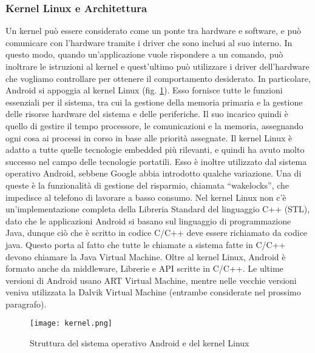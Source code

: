 \subsubsection{Kernel Linux e Architettura}
Un kernel può essere considerato come un ponte tra hardware e software, e può comunicare con
l’hardware tramite i driver che sono inclusi al suo interno. In questo modo, quando
un’applicazione vuole rispondere a un comando, può inoltrare le istruzioni al
kernel e quest’ultimo può utilizzare i driver dell’hardware che vogliamo
controllare per ottenere il comportamento desiderato. In particolare, Android si
appoggia al kernel Linux (fig. \ref{kernel}). Esso fornisce
tutte le funzioni essenziali per il sistema, tra cui la gestione della memoria
primaria e la gestione delle risorse hardware del sistema e delle periferiche.
Il suo incarico quindi è quello di gestire
il tempo processore, le comunicazioni e la memoria, assegnando ogni cosa ai processi in
corso in base alle priorità assegnate. Il kernel Linux è adatto a tutte quelle
tecnologie embedded più rilevanti, e quindi ha avuto molto successo nel campo
delle tecnologie portatili.
Esso è inoltre utilizzato dal sistema operativo Android, sebbene Google abbia
introdotto qualche variazione. Una di queste è la funzionalità di gestione
del risparmio, chiamata “wakelocks”, che impedisce al telefono di lavorare a
basso consumo. Nel kernel Linux non c’è un’implementazione completa della
Libreria Standard del linguaggio C++ (STL), dato che le applicazioni Android si
basano sul linguaggio di programmazione Java, dunque ciò che è scritto in codice
C/C++ deve essere richiamato da codice java. Questo porta al fatto che tutte le chiamate a
sistema fatte in C/C++ devono chiamare la Java Virtual Machine. Oltre al
kernel Linux, Android è formato anche da  middleware, Librerie e API scritte in C/C++. Le
ultime versioni di Android usano ART Virtual Machine, mentre nelle vecchie versioni
veniva utilizzata la Dalvik Virtual Machine (entrambe considerate nel prossimo
paragrafo).
\begin{figure}
    \centering
    \texttt{[image: kernel.png]}
    \caption{Struttura del sistema operativo Android e del kernel Linux}
    \label{kernel}
\end{figure}

